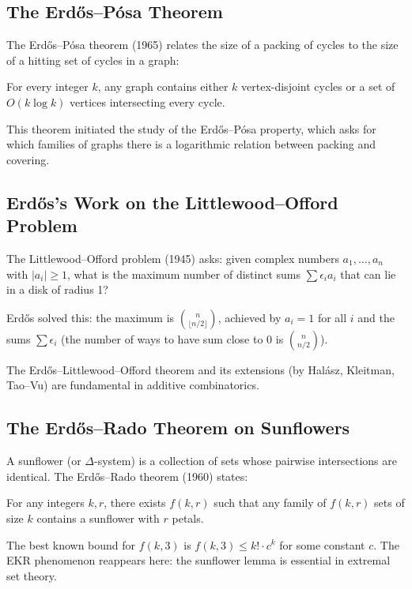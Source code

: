 \subsection{The Erd\H{o}s--P\'{o}sa Theorem}

The Erd\H{o}s--P\'{o}sa theorem (1965) relates the size of a packing of cycles to the size of a hitting set of cycles in a graph:
\begin{theorem}[Erd\H{o}s--P\'{o}sa]
For every integer $k$, any graph contains either $k$ vertex-disjoint cycles or a set of $O(k \log k)$ vertices intersecting every cycle.
\end{theorem}

This theorem initiated the study of the Erd\H{o}s--P\'{o}sa property, which asks for which families of graphs there is a logarithmic relation between packing and covering.

\subsection{Erd\H{o}s's Work on the Littlewood--Offord Problem}

The Littlewood--Offord problem (1945) asks: given complex numbers $a_1, \ldots, a_n$ with $|a_i| \geq 1$, what is the maximum number of distinct sums $\sum \epsilon_i a_i$ that can lie in a disk of radius 1?

Erd\H{o}s solved this: the maximum is $\binom{n}{\lfloor n/2\rfloor}$, achieved by $a_i = 1$ for all $i$ and the sums $\sum \epsilon_i$ (the number of ways to have sum close to 0 is $\binom{n}{n/2}$).

The Erd\H{o}s--Littlewood--Offord theorem and its extensions (by Hal\'{a}sz, Kleitman, Tao--Vu) are fundamental in additive combinatorics.

\subsection{The Erd\H{o}s--Rado Theorem on Sunflowers}

A sunflower (or $\Delta$-system) is a collection of sets whose pairwise intersections are identical. The Erd\H{o}s--Rado theorem (1960) states:
\begin{theorem}
For any integers $k, r$, there exists $f(k,r)$ such that any family of $f(k,r)$ sets of size $k$ contains a sunflower with $r$ petals.
\end{theorem}

The best known bound for $f(k,3)$ is $f(k,3) \leq k! \cdot c^k$ for some constant $c$. The EKR phenomenon reappears here: the sunflower lemma is essential in extremal set theory.

